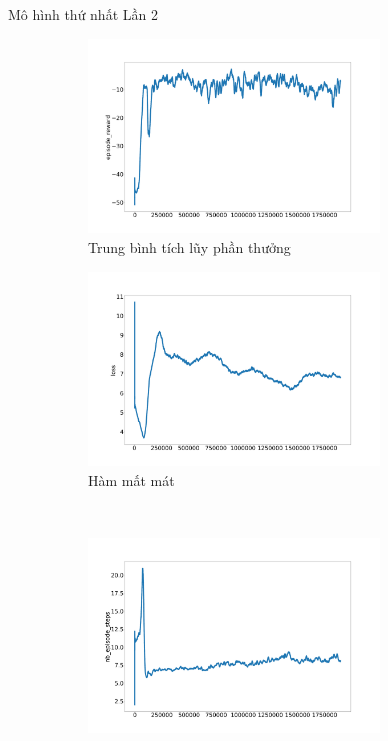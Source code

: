 \documentclass{beamer}
\begin{document}
\begin{frame}{Mô hình thứ nhất}
Lần 2
\begin{figure}[ht]
    	\centering
    	\begin{subfigure}{.5\textwidth}
    		\includegraphics[width=0.85\textwidth]{Pic/First_model_50_reward/episode_reward.png}
    		\caption{Trung bình tích lũy phần thưởng}
    		\label{fig:baseline_avg}
    	\end{subfigure}%
    	\begin{subfigure}{.5\textwidth}
    		\includegraphics[width=0.85\textwidth]{Pic/First_model_50_reward/loss.png}
    		\caption{Hàm mất mát}
    		\label{fig:baseline_loss}
    	\end{subfigure}\\
    	\begin{subfigure}{.5\textwidth}
    		\includegraphics[width=0.85\textwidth]{Pic/First_model_50_reward/nb_episode_steps.png}

\end{subfigure}
\end{figure}
\end{frame}
\end{document}
